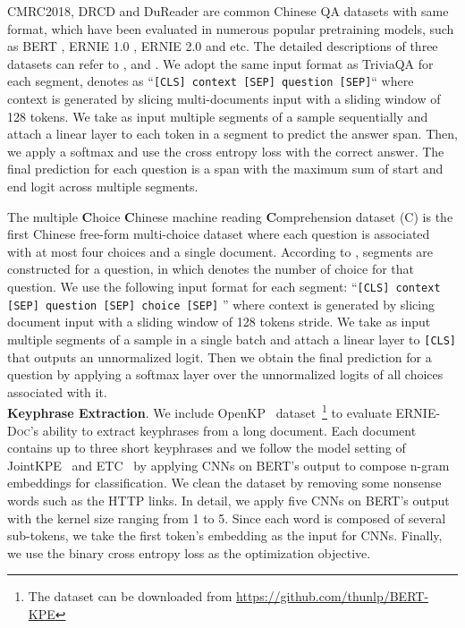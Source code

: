 \documentclass[11pt,a4paper]{article}
\newcommand{\mname}{\textsc{ERNIE-Doc}\xspace}
\begin{document}
CMRC2018, DRCD and DuReader are common Chinese QA datasets with same format, which have been evaluated in numerous popular pretraining models, such as BERT \citep{devlin2018bert}, ERNIE 1.0 \citep{sun2019ernie}, ERNIE 2.0 \citep{sun2020ernie} and etc. The detailed descriptions of three datasets can refer to \citet{cmrc2018}, \citet{drcd} and \citet{dureader}. We adopt the same input format as TriviaQA for each segment, denotes as ``\texttt{[CLS] context [SEP] question [SEP]}`` where context is generated by slicing multi-documents input with a sliding window of 128 tokens. We take as input multiple segments of a sample sequentially and attach a linear layer to each token in a segment to predict the answer span. Then, we apply a softmax and use the cross entropy loss with the correct answer. The final prediction for each question is a span with the maximum sum of start and end logit across multiple segments. 

The multiple \textbf{C}hoice \textbf{C}hinese machine reading \textbf{C}omprehension dataset (C) \citep{c3} is the first Chinese free-form multi-choice dataset where each question is associated with at most four choices and a single document. According to \citep{c3},  segments are constructed for a question, in which  denotes the number of choice for that question. We use the following input format for each segment:  ``\texttt{[CLS] context [SEP] question [SEP] choice [SEP]} '' where context is generated by slicing document input with a sliding window of 128 tokens stride. We take as input multiple segments of a sample in a single batch and attach a linear layer to \texttt{[CLS]} that outputs an unnormalized logit. Then we obtain the final prediction for a question by applying a softmax layer over the unnormalized logits of all choices associated with it. 
\\

\noindent \textbf{Keyphrase Extraction}. We include OpenKP~\citep{xiong2019open} dataset~\footnote{The dataset can be downloaded from \url{https://github.com/thunlp/BERT-KPE}} to evaluate \mname's ability to extract keyphrases from a long document. Each document contains up to three short keyphrases and we follow the model setting of JointKPE~\citep{sun2020joint} and ETC~\citep{ainslie2020etc} by applying CNNs on BERT's output to compose n-gram embeddings for classification. We clean the dataset by removing some nonsense words such as the HTTP links. In detail, we apply five CNNs on BERT's output with the kernel size ranging from 1 to 5. Since each word is composed of several sub-tokens, we take the first token's embedding as the input for CNNs. Finally, we use the binary cross entropy loss as the optimization objective.
\end{document}
